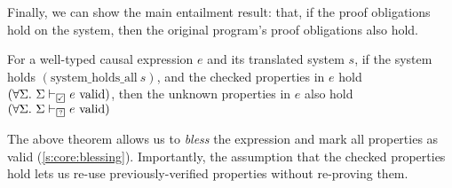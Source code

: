 Finally, we can show the main entailment result: that, if the proof obligations hold on the system, then the original program's proof obligations also hold.

\begin{theorem}
  For a well-typed causal expression $e$ and its translated system $s$, if the system holds $(\text{system_holds_all}~s)$, and the checked properties in $e$ hold $(\forall \Sigma.~\semcheck{\Sigma}{\PSValid}{e})$, then
  the unknown properties in $e$ also hold $(\forall \Sigma.~\semcheck{\Sigma}{\PSUnknown}{e})$
\end{theorem}

The above theorem allows us to \emph{bless} the expression and mark all properties as valid (\autoref{s:core:blessing}).
Importantly, the assumption that the checked properties hold lets us re-use previously-verified properties without re-proving them.
